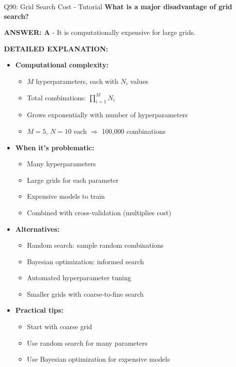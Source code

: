 \documentclass[8pt]{beamer}
\begin{document}
	\begin{frame}{Q90: Grid Search Cost - Tutorial}
		\fontsize{6.5}{7.5}\selectfont
		\textbf{What is a major disadvantage of grid search?}
		
		\vspace{0.05cm}
		\textcolor{myblue}{\textbf{ANSWER: A}} - It is computationally expensive for large grids.
		
		\vspace{0.05cm}
		\textbf{DETAILED EXPLANATION:}
		\begin{itemize}
			\item \textbf{Computational complexity:}
			\begin{itemize}
				\item $M$ hyperparameters, each with $N_i$ values
				\item Total combinations: $\prod_{i=1}^M N_i$
				\item Grows exponentially with number of hyperparameters
				\item $M=5$, $N=10$ each $\Rightarrow$ 100,000 combinations
			\end{itemize}
			\item \textbf{When it's problematic:}
			\begin{itemize}
				\item Many hyperparameters
				\item Large grids for each parameter
				\item Expensive models to train
				\item Combined with cross-validation (multiplies cost)
			\end{itemize}
			\item \textbf{Alternatives:}
			\begin{itemize}
				\item Random search: sample random combinations
				\item Bayesian optimization: informed search
				\item Automated hyperparameter tuning
				\item Smaller grids with coarse-to-fine search
			\end{itemize}
			\item \textbf{Practical tips:}
			\begin{itemize}
				\item Start with coarse grid
				\item Use random search for many parameters
				\item Use Bayesian optimization for expensive models
			\end{itemize}
		\end{itemize}
		

\end{frame}
\end{document}
